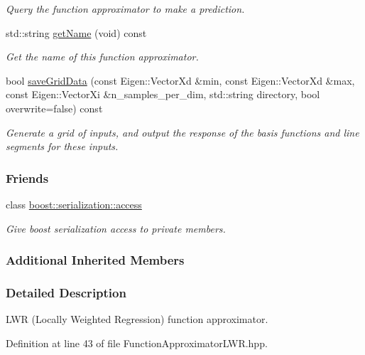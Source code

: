 \begin{DoxyCompactItemize}
\begin{DoxyCompactList}\small\item\em Query the function approximator to make a prediction. \end{DoxyCompactList}\item 
std\+::string \hyperlink{classDmpBbo_1_1FunctionApproximatorLWR_ad4c95407e44ba3e16b9651f9b81cd0e6}{get\+Name} (void) const 
\begin{DoxyCompactList}\small\item\em Get the name of this function approximator. \end{DoxyCompactList}\item 
bool \hyperlink{classDmpBbo_1_1FunctionApproximatorLWR_a53d95f63de3b49491b1204f45a24ae25}{save\+Grid\+Data} (const Eigen\+::\+Vector\+Xd \&min, const Eigen\+::\+Vector\+Xd \&max, const Eigen\+::\+Vector\+Xi \&n\+\_\+samples\+\_\+per\+\_\+dim, std\+::string directory, bool overwrite=false) const 
\begin{DoxyCompactList}\small\item\em Generate a grid of inputs, and output the response of the basis functions and line segments for these inputs. \end{DoxyCompactList}\end{DoxyCompactItemize}
\subsubsection*{Friends}
\begin{DoxyCompactItemize}
\item 
class \hyperlink{classDmpBbo_1_1FunctionApproximatorLWR_ac98d07dd8f7b70e16ccb9a01abf56b9c}{boost\+::serialization\+::access}
\begin{DoxyCompactList}\small\item\em Give boost serialization access to private members. \end{DoxyCompactList}\end{DoxyCompactItemize}
\subsubsection*{Additional Inherited Members}


\subsubsection{Detailed Description}
L\+W\+R (Locally Weighted Regression) function approximator. 

Definition at line 43 of file Function\+Approximator\+L\+W\+R.\+hpp.



